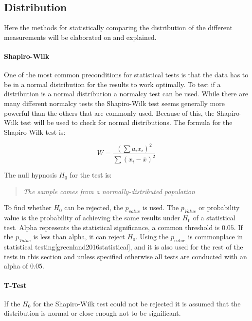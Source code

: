 \subsection{Distribution}
Here the methods for statistically comparing the distribution of the different measurements will be elaborated on and explained.

\paragraph{Shapiro-Wilk}
One of the most common preconditions for statistical tests is that the data has to be in a normal distribution for the results to work optimally. To test if a distribution is a normal distribution a normalcy test can be used. While there are many different normalcy tests the Shapiro-Wilk test seems generally more powerful than the others that are commonly used\cite{razali2011power}. Because of this, the Shapiro-Wilk test will be used to check for normal distributions. The formula for the Shapiro-Wilk test is:

\begin{equation}
    W=\frac{( \sum{a_i x_i} )^2}{\sum{(x_i - \bar{x})^2}}
\end{equation}

The null hypnosis $H_0$ for the test is:

\begin{quotation}
    \textit{The sample comes from a normally-distributed population}
\end{quotation}

To find whether $H_0$ can be rejected, the $p_{value}$ is used. The $p_{Value}$ or probability value is the probability of achieving the same results under $H_0$ of a statistical test. Alpha represents the statistical significance, a common threshold is $0.05$. If the $p_{Value}$ is less than alpha, it can reject $H_0$. Using the $p_{value}$ is commonplace in statistical testing[greenland2016statistical], and it is also used for the rest of the tests in this section and unless specified otherwise all tests are conducted with an alpha of $0.05$.

\paragraph{T-Test}

If the $H_0$ for the Shapiro-Wilk test could not be rejected it is assumed that the distribution is normal or close enough not to be significant.

